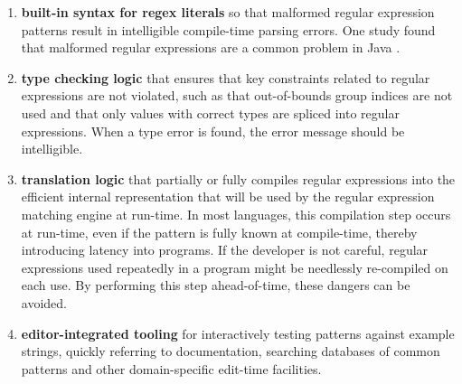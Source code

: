 \begin{enumerate}
\item \textbf{built-in syntax for regex literals} so that malformed regular expression patterns result in intelligible compile-time parsing errors. One study found that malformed regular expressions are a common problem in Java \cite{regex-type-system}.
\item \textbf{type checking logic} that ensures that key constraints related to regular expressions are not violated, such as that out-of-bounds group indices are not used \cite{regex-type-system} and that only values with correct types are spliced into regular expressions. When a type error is found, the error message should be intelligible.
\item \textbf{translation logic} that partially or fully compiles regular expressions into the efficient internal representation that will be used by the regular expression matching engine at run-time. In most languages, this compilation step occurs at run-time, even if the pattern is fully known at compile-time, thereby introducing latency into programs. If the developer is not careful, regular expressions used repeatedly in a program might be needlessly re-compiled on each use. By performing this step ahead-of-time, these dangers can be avoided.
\item \textbf{editor-integrated tooling} for interactively testing patterns against example strings, quickly referring to documentation, searching databases of common patterns and other domain-specific edit-time facilities.
\end{enumerate}


